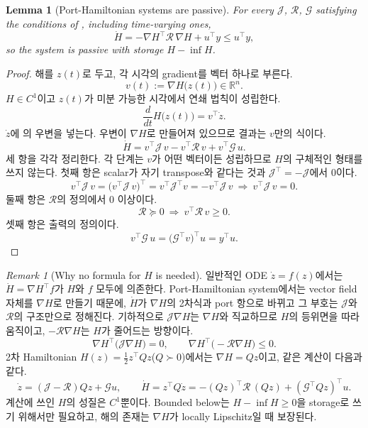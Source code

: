 \documentclass[11pt]{article}\usepackage[margin=1in]{geometry}\usepackage{amsmath,amssymb,amsthm,mathtools}\usepackage{graphicx}\graphicspath{{figures/}{../figures/}{figs/}{./}}\usepackage{enumitem}\usepackage{hyperref}\usepackage{cleveref}\usepackage{tikz}\usetikzlibrary{arrows.meta,positioning,calc,shapes.geometric}\usepackage{float}\usepackage{rotating}\usepackage[most]{tcolorbox}\usepackage{kotex}\usepackage{booktabs}\usepackage{longtable}\emergencystretch=1.6em\tolerance=2000 \crefname{assumption}{Assumption}{Assumptions}\Crefname{assumption}{Assumption}{Assumptions}\crefname{definition}{Definition}{Definitions}\Crefname{definition}{Definition}{Definitions}\crefname{proposition}{Proposition}{Propositions}\Crefname{proposition}{Proposition}{Propositions}\crefname{fact}{Fact}{Facts}\Crefname{fact}{Fact}{Facts} \newtheorem{assumption}{Assumption}\newtheorem{definition}{Definition}\newtheorem{lemma}{Lemma}\newtheorem{proposition}{Proposition}\newtheorem{theorem}{Theorem}\newtheorem{corollary}{Corollary}\newtheorem{fact}{Fact}\theoremstyle{remark}\newtheorem{remark}{Remark} \newcommand{\R}{\mathbb{R}}\newcommand{\xb}{\bar x}\newcommand{\Ab}{\bar A}\newcommand{\By}{\bar B_y}\newcommand{\U}{\mathcal U}\newcommand{\Z}{\mathcal Z}
\begin{document}
\begin{lemma}[Port-Hamiltonian systems are passive]
\label{lem:phpassive}
For every $\mathcal J$, $\mathcal R$, $\mathcal G$ satisfying the conditions of , including time-varying ones,
\[
\dot H=-\nabla H^\top\mathcal R\,\nabla H+u^\top y\le u^\top y ,
\]
so the system is passive with storage $H-\inf H$.
\end{lemma}

\begin{proof}
해를 $z(t)$로 두고, 각 시각의 gradient를 벡터 하나로 부른다.
\[
v(t):=\nabla H\big(z(t)\big)\in\R^n .
\]
$H\in C^1$이고 $z(t)$가 미분 가능한 시각에서 연쇄 법칙이 성립한다.
\[
\frac{d}{dt}H\big(z(t)\big)=v^\top\dot z .
\]
$\dot z$에 의 우변을 넣는다. 우변이 $\nabla H$로 만들어져 있으므로 결과는 $v$만의 식이다.
\[
\dot H=v^\top\mathcal J\,v-v^\top\mathcal R\,v+v^\top\mathcal G\,u .
\]
세 항을 각각 정리한다. 각 단계는 $v$가 어떤 벡터이든 성립하므로 $H$의 구체적인 형태를 쓰지 않는다. 첫째 항은 scalar가 자기 transpose와 같다는 것과 $\mathcal J^\top=-\mathcal J$에서 0이다.
\[
v^\top\mathcal J\,v=\big(v^\top\mathcal J\,v\big)^\top=v^\top\mathcal J^\top v=-v^\top\mathcal J\,v\ \Longrightarrow\ v^\top\mathcal J\,v=0 .
\]
둘째 항은 $\mathcal R$의 정의에서 0 이상이다.
\[
\mathcal R\succeq0\ \Longrightarrow\ v^\top\mathcal R\,v\ge0 .
\]
셋째 항은 출력의 정의이다.
\[
v^\top\mathcal G\,u=\big(\mathcal G^\top v\big)^\top u=y^\top u .
\]
\end{proof}

\begin{remark}[Why no formula for $H$ is needed]
\label{rem:noformula}
일반적인 ODE $\dot z=f(z)$에서는 $\dot H=\nabla H^\top f$가 $H$와 $f$ 모두에 의존한다. Port-Hamiltonian system에서는 vector field 자체를 $\nabla H$로 만들기 때문에, $\dot H$가 $\nabla H$의 2차식과 port 항으로 바뀌고 그 부호는 $\mathcal J$와 $\mathcal R$의 구조만으로 정해진다. 기하적으로 $\mathcal J\nabla H$는 $\nabla H$와 직교하므로 $H$의 등위면을 따라 움직이고, $-\mathcal R\nabla H$는 $H$가 줄어드는 방향이다.
\[
\nabla H^\top\big(\mathcal J\nabla H\big)=0,\qquad \nabla H^\top\big(-\mathcal R\nabla H\big)\le0 .
\]
2차 Hamiltonian $H(z)=\tfrac12z^\top Qz$($Q\succ0$)에서는 $\nabla H=Qz$이고, 같은 계산이 다음과 같다.
\[
\dot z=(\mathcal J-\mathcal R)Qz+\mathcal Gu,\qquad \dot H=z^\top Q\dot z=-(Qz)^\top\mathcal R\,(Qz)+(\mathcal G^\top Qz)^\top u .
\]
계산에 쓰인 $H$의 성질은 $C^1$뿐이다. Bounded below는 $H-\inf H\ge0$을 storage로 쓰기 위해서만 필요하고, 해의 존재는 $\nabla H$가 locally Lipschitz일 때 보장된다.
\end{remark}
\end{document}
